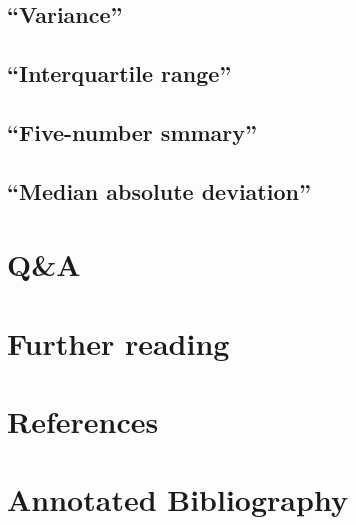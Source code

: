 \documentclass[]{book}
\theoremstyle{definition}
\theoremstyle{definition}
\theoremstyle{definition}
\theoremstyle{remark}
\begin{document}
\subsection{\texorpdfstring{``Variance''}{Variance}}\label{variance}

\subsection{\texorpdfstring{``Interquartile
range''}{Interquartile range}}\label{interquartile-range}

\subsection{\texorpdfstring{``Five-number
smmary''}{Five-number smmary}}\label{five-number-smmary}

\subsection{\texorpdfstring{``Median absolute
deviation''}{Median absolute deviation}}\label{median-absolute-deviation}

\section{Q\&A}\label{qa-1}

\section*{Further reading}\label{further-reading-4}

\section*{References}\label{references-4}

\section*{Annotated Bibliography}\label{annotated-bibliography-4}


\end{document}
